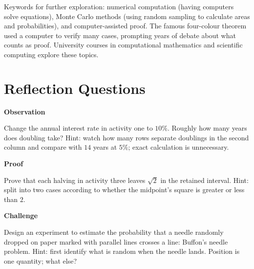 \begin{pandeng}
Keywords for further exploration: numerical computation (having computers solve equations), Monte Carlo methods (using random sampling to calculate areas and probabilities), and computer-assisted proof. The famous four-colour theorem used a computer to verify many cases, prompting years of debate about what counts as proof. University courses in computational mathematics and scientific computing explore these topics.
\end{pandeng}

\section*{Reflection Questions}

\textbf{Observation}
\begin{sikao}
\item Change the annual interest rate in activity one to $10\%$. Roughly how many years does doubling take? Hint: watch how many rows separate doublings in the second column and compare with $14$ years at $5\%$; exact calculation is unnecessary.
\end{sikao}

\textbf{Proof}
\begin{sikao}
\item Prove that each halving in activity three leaves $\sqrt{2}$ in the retained interval. Hint: split into two cases according to whether the midpoint's square is greater or less than $2$.
\end{sikao}

\textbf{Challenge}
\begin{sikao}
\item Design an experiment to estimate the probability that a needle randomly dropped on paper marked with parallel lines crosses a line: Buffon's needle problem. Hint: first identify what is random when the needle lands. Position is one quantity; what else?
\end{sikao}
